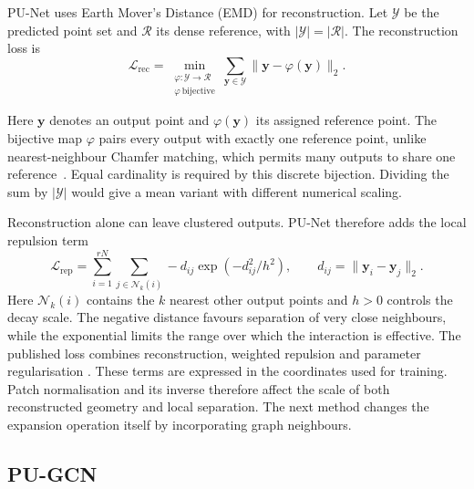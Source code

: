 \begin{samepage}
PU-Net uses Earth Mover's Distance (EMD) for reconstruction.
Let $\mathcal Y$ be the predicted point set and $\mathcal R$ its dense
reference, with $|\mathcal Y|=|\mathcal R|$. The reconstruction loss is
\begin{equation}
 \mathcal L_\mathrm{rec}
 =\min_{\substack{\varphi:\mathcal Y\to\mathcal R\\
                  \varphi\ \mathrm{bijective}}}
 \sum_{\mathbf y\in\mathcal Y}\|\mathbf y-\varphi(\mathbf y)\|_2.
 \label{eq:emd}
\end{equation}
\end{samepage}
Here $\mathbf y$ denotes an output point and $\varphi(\mathbf y)$ its
assigned reference point. The bijective map $\varphi$ pairs every output
with exactly one reference point,
unlike nearest-neighbour Chamfer matching, which permits many outputs to
share one reference~\cite{yu2018punet,fan2017pointsetgen}. Equal cardinality
is required by this discrete bijection. Dividing the sum by $|\mathcal Y|$
would give a mean variant with different numerical scaling.

Reconstruction alone can leave clustered outputs. PU-Net therefore adds
the local repulsion term
\begin{equation}
 \mathcal L_\mathrm{rep}=\sum_{i=1}^{rN}\sum_{j\in\mathcal N_k(i)}
 -d_{ij}\exp(-d_{ij}^2/h^2),
 \qquad d_{ij}=\|\mathbf y_i-\mathbf y_j\|_2.
 \label{eq:repulsion}
\end{equation}
Here $\mathcal N_k(i)$ contains the $k$ nearest other output points and
$h>0$ controls the decay scale. The negative distance favours separation
of very close neighbours, while the exponential limits the range over
which the interaction is effective. The published loss combines
reconstruction, weighted repulsion and parameter regularisation
\cite{yu2018punet}. These terms are expressed in the coordinates used for
training. Patch normalisation and its inverse therefore affect the scale
of both reconstructed geometry and local separation. The next method
changes the expansion operation itself by incorporating graph neighbours.

\subsection{PU-GCN}
\label{subsec:pugcn}

